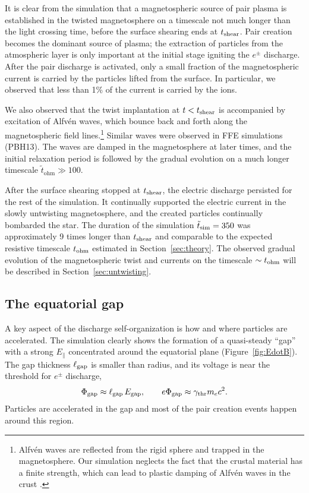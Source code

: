 It is clear from the simulation that a magnetospheric source of pair plasma is
established in the twisted magnetosphere on a timescale not much longer than the
light crossing time, before the surface shearing ends at $t_{\rm shear}$. Pair creation
becomes the dominant source of plasma; the extraction of particles from the
atmospheric layer is only important at the initial stage igniting the $e^\pm$
discharge. After the pair discharge is activated, only a small fraction of the
magnetospheric current is carried by the particles lifted from the surface. In
particular, we observed that less than 1\% of the current is carried by the
ions.

We also observed that the twist implantation at $t<t_{\rm shear}$ is accompanied by excitation
of Alfv\'en waves, which bounce back and forth along the magnetospheric field
lines.\footnote{Alfv\'en waves
    are reflected from the rigid sphere and trapped in the magnetosphere. Our simulation
    neglects the fact that the crustal material has a finite strength, which can lead to
    plastic damping of Alfv\'en waves in the crust
    \citep{li_plastic_2015}.
  }
Similar waves were observed in FFE simulations (PBH13).
The waves are damped in the magnetosphere at later times, and the initial relaxation
period is followed by the gradual evolution on a much longer timescale $\tilde{t}_\mathrm{ohm}\gg 100$.

After the surface shearing stopped at $t_{\rm shear}$, the electric discharge
persisted for the rest of the simulation. It continually supported the electric current in
the slowly untwisting magnetosphere, and the created particles continually bombarded the star.
The duration of the simulation $\tilde{t}_{\rm sim}=350$ was approximately 9 times longer than
$t_{\rm shear}$ and comparable to the expected resistive timescale $t_{\rm ohm}$ estimated in Section~\ref{sec:theory}.
The observed gradual evolution of the magnetospheric twist and currents on the
timescale $\sim t_{\rm ohm}$ will be described in Section~\ref{sec:untwisting}.


\subsection{The equatorial gap}
\label{sec:gap}


A key aspect of the discharge self-organization is how and where
particles are accelerated. The simulation clearly shows the formation of a quasi-steady
``gap'' with a strong $E_\parallel$ concentrated around the equatorial plane
(Figure~\ref{fig:EdotB}). The gap thickness $\ell_{\rm gap}$ is smaller than radius,
and its voltage is near the threshold for $e^\pm$ discharge,
\begin{equation}
  \Phi_{\rm gap}\approx\ell_{\rm gap}\,E_{\rm gap}, \qquad e\Phi_{\rm gap}\approx\gamma_{\rm thr} m_ec^2.
\end{equation}
Particles are accelerated in the gap and most of the pair
creation events happen around this region.


